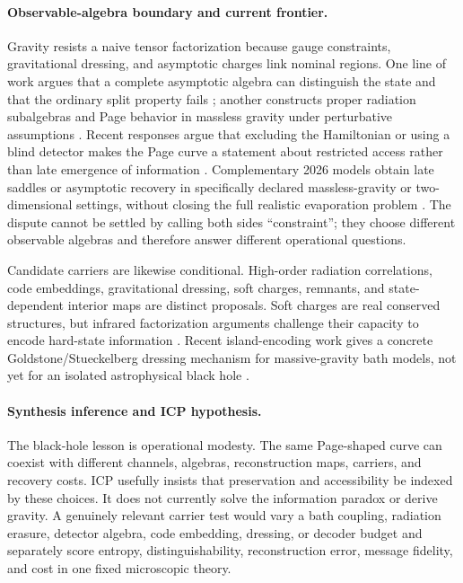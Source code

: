 \paragraph{Observable-algebra boundary and current frontier.}
Gravity resists a naive tensor factorization because gauge constraints,
gravitational dressing, and asymptotic charges link nominal regions.  One line
of work argues that a complete asymptotic algebra can distinguish the state and
that the ordinary split property fails \citep{Raju2022SplitProperty}; another
constructs proper radiation subalgebras and Page behavior in massless gravity
under perturbative assumptions \citep{AntoniniEtAl2025Apologia}.  Recent
responses argue that excluding the Hamiltonian or using a blind detector makes
the Page curve a statement about restricted access rather than late emergence
of information \citep{GengEtAl2026Blinders}.  Complementary 2026 models obtain
late saddles or asymptotic recovery in specifically declared massless-gravity
or two-dimensional settings, without closing the full realistic evaporation
problem \citep{Kumar2026MasslessIslands,DarEtAl2026CGHSAlgebras}.  The dispute
cannot be settled by calling both sides ``constraint''; they choose different
observable algebras and therefore answer different operational questions.

Candidate carriers are likewise conditional.  High-order radiation
correlations, code embeddings, gravitational dressing, soft charges, remnants,
and state-dependent interior maps are distinct proposals.  Soft charges are
real conserved structures, but infrared factorization arguments challenge
their capacity to encode hard-state information
\citep{HawkingPerryStrominger2016SoftHair,
MirbabayiPorrati2016Shaving}.  Recent island-encoding work gives a concrete
Goldstone/Stueckelberg dressing mechanism for massive-gravity bath models, not
yet for an isolated astrophysical black hole \citep{Geng2026IslandEncoding}.

\paragraph{Synthesis inference and ICP hypothesis.}
The black-hole lesson is operational modesty.  The same Page-shaped curve can
coexist with different channels, algebras, reconstruction maps, carriers, and
recovery costs.  ICP usefully insists that preservation and accessibility be
indexed by these choices.  It does not currently solve the information paradox
or derive gravity.  A genuinely relevant carrier test would vary a bath
coupling, radiation erasure, detector algebra, code embedding, dressing, or
decoder budget and separately score entropy, distinguishability,
reconstruction error, message fidelity, and cost in one fixed microscopic
theory.

